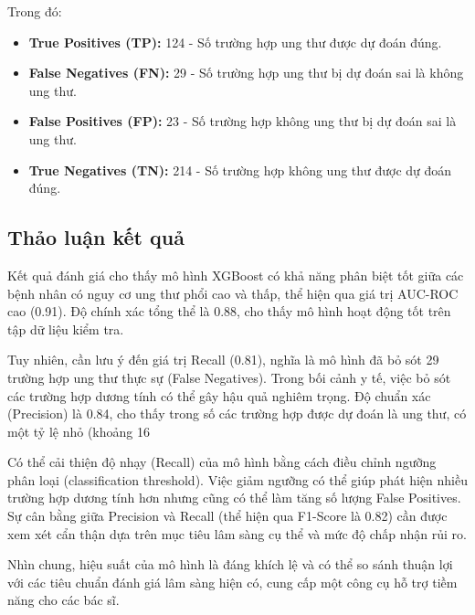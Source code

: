 Trong đó:
\begin{itemize}
    \item \textbf{True Positives (TP):} 124 - Số trường hợp ung thư được dự đoán đúng.
    \item \textbf{False Negatives (FN):} 29 - Số trường hợp ung thư bị dự đoán sai là không ung thư.
    \item \textbf{False Positives (FP):} 23 - Số trường hợp không ung thư bị dự đoán sai là ung thư.
    \item \textbf{True Negatives (TN):} 214 - Số trường hợp không ung thư được dự đoán đúng.
\end{itemize}

\subsection{Thảo luận kết quả}

Kết quả đánh giá cho thấy mô hình XGBoost có khả năng phân biệt tốt giữa các bệnh nhân có nguy cơ ung thư phổi cao và thấp, thể hiện qua giá trị AUC-ROC cao (0.91). Độ chính xác tổng thể là 0.88, cho thấy mô hình hoạt động tốt trên tập dữ liệu kiểm tra.

Tuy nhiên, cần lưu ý đến giá trị Recall (0.81), nghĩa là mô hình đã bỏ sót 29 trường hợp ung thư thực sự (False Negatives). Trong bối cảnh y tế, việc bỏ sót các trường hợp dương tính có thể gây hậu quả nghiêm trọng. Độ chuẩn xác (Precision) là 0.84, cho thấy trong số các trường hợp được dự đoán là ung thư, có một tỷ lệ nhỏ (khoảng 16%

Có thể cải thiện độ nhạy (Recall) của mô hình bằng cách điều chỉnh ngưỡng phân loại (classification threshold). Việc giảm ngưỡng có thể giúp phát hiện nhiều trường hợp dương tính hơn nhưng cũng có thể làm tăng số lượng False Positives. Sự cân bằng giữa Precision và Recall (thể hiện qua F1-Score là 0.82) cần được xem xét cẩn thận dựa trên mục tiêu lâm sàng cụ thể và mức độ chấp nhận rủi ro.

Nhìn chung, hiệu suất của mô hình là đáng khích lệ và có thể so sánh thuận lợi với các tiêu chuẩn đánh giá lâm sàng hiện có, cung cấp một công cụ hỗ trợ tiềm năng cho các bác sĩ.
